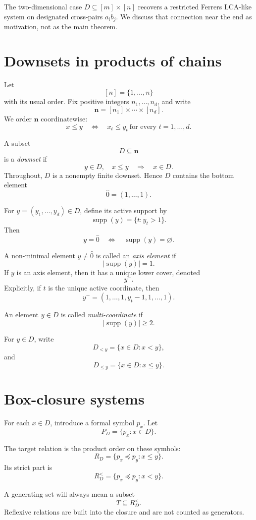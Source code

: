 \documentclass[11pt]{article}
\begin{document}
The two-dimensional case $D\subseteq [m]\times[n]$ recovers a restricted Ferrers LCA-like system on designated cross-pairs $a_i b_j$. We discuss that connection near the end as motivation, not as the main theorem.

\section{Downsets in products of chains}

Let
\[
[n]=\{1,\dots,n\}
\]
with its usual order. Fix positive integers $n_1,\dots,n_d$, and write
\[
\mathbf n=[n_1]\times\cdots\times[n_d].
\]
We order $\mathbf n$ coordinatewise:
\[
x\le y
\quad\Longleftrightarrow\quad
x_t\le y_t\ \text{for every }t=1,\dots,d.
\]

A subset
\[
D\subseteq \mathbf n
\]
is a \emph{downset} if
\[
y\in D,\quad x\le y
\quad\Longrightarrow\quad
x\in D.
\]
Throughout, $D$ is a nonempty finite downset. Hence $D$ contains the bottom element
\[
\hat{0}=(1,\dots,1).
\]

For $y=(y_1,\dots,y_d)\in D$, define its active support by
\[
\operatorname{supp}(y)=\{t:y_t>1\}.
\]
Then
\[
y=\hat{0}
\quad\Longleftrightarrow\quad
\operatorname{supp}(y)=\varnothing.
\]

A non-minimal element $y\ne\hat{0}$ is called an \emph{axis element} if
\[
|\operatorname{supp}(y)|=1.
\]
If $y$ is an axis element, then it has a unique lower cover, denoted
\[
y^-.
\]
Explicitly, if $t$ is the unique active coordinate, then
\[
y^-=(1,\dots,1,y_t-1,1,\dots,1).
\]

An element $y\in D$ is called \emph{multi-coordinate} if
\[
|\operatorname{supp}(y)|\ge2.
\]

For $y\in D$, write
\[
D_{<y}=\{x\in D:x<y\},
\]
and
\[
D_{\le y}=\{x\in D:x\le y\}.
\]

\section{Box-closure systems}

For each $x\in D$, introduce a formal symbol $p_x$. Let
\[
P_D=\{p_x:x\in D\}.
\]

The target relation is the product order on these symbols:
\[
R_D=\{p_x\preceq p_y:x\le y\}.
\]
Its strict part is
\[
R_D^{<}=\{p_x\preceq p_y:x<y\}.
\]

A generating set will always mean a subset
\[
T\subseteq R_D^{<}.
\]
Reflexive relations are built into the closure and are not counted as generators.
\end{document}
